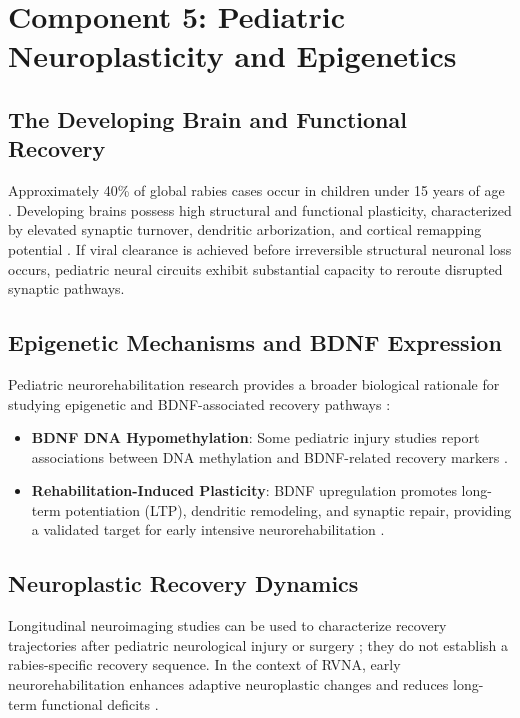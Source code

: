\documentclass[12pt,a4paper]{article}
\begin{document}
\section{Component 5: Pediatric Neuroplasticity and Epigenetics}

\subsection{The Developing Brain and Functional Recovery}

Approximately 40\% of global rabies cases occur in children under 15 years of age \citep{liu2025syn023}. Developing brains possess high structural and functional plasticity, characterized by elevated synaptic turnover, dendritic arborization, and cortical remapping potential . If viral clearance is achieved before irreversible structural neuronal loss occurs, pediatric neural circuits exhibit substantial capacity to reroute disrupted synaptic pathways.

\subsection{Epigenetic Mechanisms and BDNF Expression}

Pediatric neurorehabilitation research provides a broader biological rationale for studying epigenetic and BDNF-associated recovery pathways \citep{heinsberg2026bdnf}:
\begin{itemize}
    \item \textbf{BDNF DNA Hypomethylation}: Some pediatric injury studies report associations between DNA methylation and BDNF-related recovery markers \citep{heinsberg2026bdnf}.
    \item \textbf{Rehabilitation-Induced Plasticity}: BDNF upregulation promotes long-term potentiation (LTP), dendritic remodeling, and synaptic repair, providing a validated target for early intensive neurorehabilitation \citep{heinsberg2026bdnf}.
\end{itemize}

\subsection{Neuroplastic Recovery Dynamics}

Longitudinal neuroimaging studies can be used to characterize recovery trajectories after pediatric neurological injury or surgery \citep{yan2025neurosurg}; they do not establish a rabies-specific recovery sequence. In the context of RVNA, early neurorehabilitation enhances adaptive neuroplastic changes and reduces long-term functional deficits \citep{yan2025neurosurg}.
\end{document}

